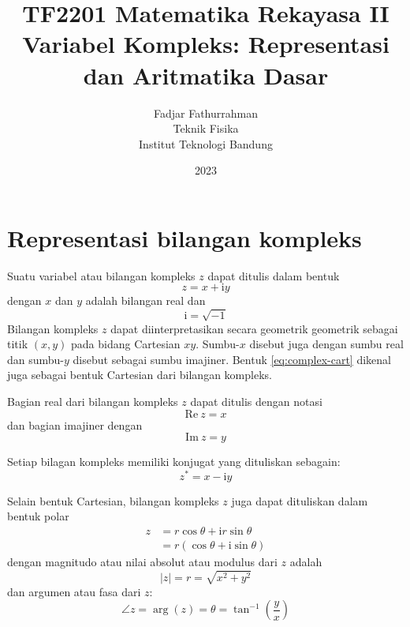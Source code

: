 



\title{%
{\small TF2201 Matematika Rekayasa II}\\
Variabel Kompleks: Representasi dan Aritmatika Dasar
}
\author{Fadjar Fathurrahman\\
Teknik Fisika\\
Institut Teknologi Bandung}
\date{2023}
\maketitle


\section{Representasi bilangan kompleks}

Suatu variabel atau bilangan kompleks $z$ dapat ditulis dalam bentuk
\begin{equation}
z = x + \mathrm{i}y
\label{eq:complex-cart}
\end{equation}
dengan $x$ dan $y$ adalah bilangan real dan
\begin{equation}
\mathrm{i} = \sqrt{-1}
\end{equation}
Bilangan kompleks $z$ dapat diinterpretasikan secara geometrik geometrik
sebagai titik $(x,y)$ pada bidang Cartesian $xy$.
Sumbu-$x$ disebut juga dengan sumbu real dan sumbu-$y$
disebut sebagai sumbu imajiner.
Bentuk \ref{eq:complex-cart} dikenal juga sebagai bentuk Cartesian
dari bilangan kompleks.

Bagian real dari bilangan kompleks $z$ dapat ditulis dengan notasi
\begin{equation*}
\mathrm{Re}\ z=x
\end{equation*}
dan bagian imajiner dengan
\begin{equation*}
\mathrm{Im}\ z=y
\end{equation*}

Setiap bilagan kompleks memiliki konjugat yang dituliskan sebagain:
\begin{equation}
z^{*} = x - \mathrm{i}y
\end{equation}

Selain bentuk Cartesian, bilangan kompleks $z$ juga dapat dituliskan
dalam bentuk polar
\begin{align*}
z & = r\cos\theta + \mathrm{i}r\sin\theta \\
  & = r\left( \cos\theta + \mathrm{i}\sin \theta \right)
\end{align*}
dengan magnitudo atau nilai absolut atau modulus dari $z$ adalah
\begin{equation}
\left|z\right| = r = \sqrt{x^{2} + y^{2}}
\end{equation}
dan argumen atau fasa dari $z$:
\begin{equation}
\angle z = \arg(z) = \theta = \tan^{-1}\left(\frac{y}{x}\right)
\end{equation}


